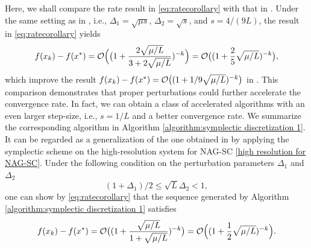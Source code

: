 \documentclass[11pt]{article}
\newcommand{\1}{\mathbf 1}
\numberwithin{equation}{section}
\begin{document}
Here, we shall compare the rate result in \eqref{eq:ratecorollary} with that in \cite{Shi_2019_acceleration}. Under the same setting as in \cite[Theorem 3.1(a)]{Shi_2019_acceleration}, i.e., $\Delta_1=\sqrt{\mu s}$, $\Delta_2=\sqrt{s}$, and $s=4/(9L)$, the result in \eqref{eq:ratecorollary} yields \[f(x_k)-f(x^*)={\cal O}\Big( \big(1+\frac{2\sqrt{\mu/L}}{3+2\sqrt{\mu/L}})^{-k}\Big)={\cal O}\big( (1+\frac{2}{5} \sqrt{\mu/L})^{-k}\big),\]
which improve the result $f(x_k)-f(x^*)={\cal O}\big((1+1/9\sqrt{\mu/L})^{-k}\big)$ in \cite[Theorem 3.1(a)]{Shi_2019_acceleration}. This comparison demonstrates that proper perturbations could further accelerate the convergence rate. In fact, we can obtain a class of accelerated algorithms with an even larger step-size, i.e., $s = 1/L$ and a better convergence rate. 
We summarize the corresponding algorithm in Algorithm \ref{algorithm:symplectic discretization 1}. It can be regarded as a generalization of the one obtained in \cite{Shi_2019_acceleration} by applying the symplectic scheme on the high-resolution system for NAG-SC \eqref{high resolution for NAG-SC}.
Under the following condition on the perturbation parameters $\Delta_1$ and $\Delta_2$  
\[(1+\Delta_1)/2 \le \sqrt{L}\Delta_2 < 1,\]
one can show by \eqref{eq:ratecorollary} that the sequence generated by Algorithm \ref{algorithm:symplectic discretization 1} satisfies
\[f(x_k)-f(x^*)={\cal O}\big((1+\frac{\sqrt{\mu/L}}{1+\sqrt{\mu/L}})^{-k}\big)={\cal O}\Big((1+\frac{1}{2}\sqrt{\mu/L})^{-k}\Big).\]



\begin{algorithm}
\caption{Optimization algorithm derived from the symplectic Euler discretization}
\label{algorithm:symplectic discretization 1}
\begin{algorithmic}[1]
\EndFor
\end{algorithmic}
\end{algorithm}
\end{document}
